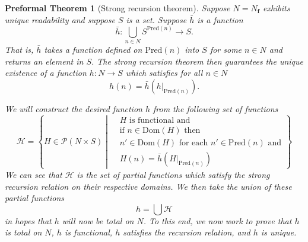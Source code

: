 \documentclass[oneside, 12pt]{book}
\theoremstyle{break}
\newtheorem{preformal definition}[definition]{Preformal Definition}
\newtheorem{preformal theorem}[theorem]{Preformal Theorem}
\newcommand{\bv}[1]{\boldsymbol{#1}}
\newcommand{\mc}[1]{\mathcal{#1}}
\begin{document}
			\begin{preformal theorem}[Strong recursion theorem]
				Suppose $N=N_{\bv{f}}$ exhibits unique readability and suppose $S$ is a set.
				Suppose $\bar{h}$ is a function
				\begin{equation*}
					\bar{h}: \bigcup_{n\in N} S^{\text{Pred}(n)} \to S.
				\end{equation*}
				That is, $\bar{h}$ takes a function defined on $\text{Pred}(n)$ into $S$ for some $n\in N$ and returns an element in $S$.
				The strong recursion theorem then guarantees the unique existence of a function $h:N \to S$ which satisfies for all $n \in N$
				\begin{equation*}
					h(n) = \bar{h}(h|_{\text{Pred}(n)}).
				\end{equation*}
				
				We will construct the desired function $h$ from the following set of functions
				\begin{equation*}
					\mc{H} = \left\{H \in \mc{P}(N\times S) \middle|\begin{aligned}
						&H \text{ is functional and }\\
						&\text{if } n\in \text{Dom}(H) \text{ then}\\
						&n' \in \text{Dom}(H) \text{ for each } n' \in \text{Pred}(n) \text{ and}\\
						&H(n) = \bar{h}\left(H|_{\text{Pred}(n)}\right)
					\end{aligned}\right\}
				\end{equation*}
				We can see that $\mc{H}$ is the set of partial functions which satisfy the strong recursion relation on their respective domains.
				We then take the union of these partial functions
				\begin{equation*}
					h = \bigcup \mc{H}
				\end{equation*}
				in hopes that $h$ will now be total on $N$.
				To this end, we now work to prove that $h$ is total on $N$, $h$ is functional, $h$ satisfies the recursion relation, and $h$ is unique.
				

\end{preformal theorem}
\end{document}
